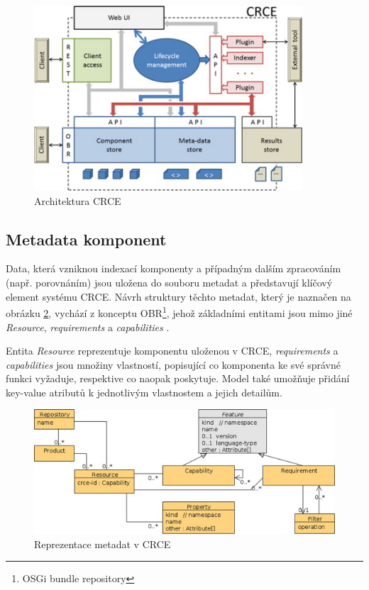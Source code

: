 \documentclass[czech,DP]{thesiskiv}
\begin{document}
\begin{figure}[h]
	\centering
	\includegraphics[width=10cm]{crce-arch.jpg}
	\caption{Architektura CRCE}
	\label{fig:crce-arch}
\end{figure} 

\subsection{Metadata komponent}
\label{subsec:crce-metadata}

Data, která vzniknou indexací komponenty a případným dalším zpracováním (např. porovnáním) jsou uložena do souboru metadat a představují klíčový element systému CRCE. Návrh struktury  těchto metadat, který je naznačen na obrázku \ref{fig:crce-resource-uml}, vychází z konceptu OBR\footnote{OSGi bundle repository}, jehož základními entitami jsou mimo jiné \textit{Resource}, \textit{requirements} a \textit{capabilities} \cite{brada2015repository}. 

Entita \textit{Resource} reprezentuje komponentu uloženou v CRCE, \textit{requirements} a \textit{capabilities} jsou množiny vlastností, popisující co komponenta ke své správné funkci vyžaduje, respektive co naopak poskytuje. Model také umožňuje přidání key-value atributů k jednotlivým vlastnostem a jejich detailům.
 
 \begin{figure}[h]
 	\centering
 	\includegraphics{resource-uml}
 	\caption{Reprezentace metadat v CRCE}
 	\label{fig:crce-resource-uml}
 \end{figure}
\end{document}
